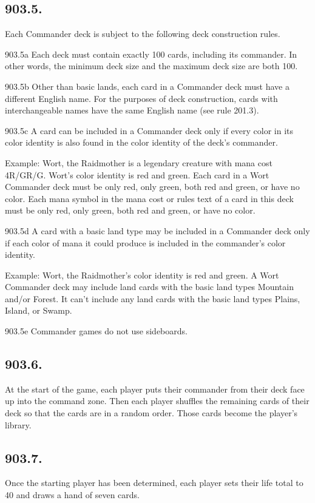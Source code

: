 \subsection*{903.5.}
Each Commander deck is subject to the following deck construction rules.

903.5a Each deck must contain exactly 100 cards, including its commander. In other words, the minimum deck size and the maximum deck size are both 100.

903.5b Other than basic lands, each card in a Commander deck must have a different English name. For the purposes of deck construction, cards with interchangeable names have the same English name (see rule 201.3).

903.5c A card can be included in a Commander deck only if every color in its color identity is also found in the color identity of the deck’s commander.

Example: Wort, the Raidmother is a legendary creature with mana cost {4}{R/G}{R/G}. Wort’s color identity is red and green. Each card in a Wort Commander deck must be only red, only green, both red and green, or have no color. Each mana symbol in the mana cost or rules text of a card in this deck must be only red, only green, both red and green, or have no color.

903.5d A card with a basic land type may be included in a Commander deck only if each color of mana it could produce is included in the commander’s color identity.

Example: Wort, the Raidmother’s color identity is red and green. A Wort Commander deck may include land cards with the basic land types Mountain and/or Forest. It can’t include any land cards with the basic land types Plains, Island, or Swamp.

903.5e Commander games do not use sideboards.

\subsection*{903.6.}
At the start of the game, each player puts their commander from their deck face up into the command zone. Then each player shuffles the remaining cards of their deck so that the cards are in a random order. Those cards become the player’s library.

\subsection*{903.7.}
Once the starting player has been determined, each player sets their life total to 40 and draws a hand of seven cards.

